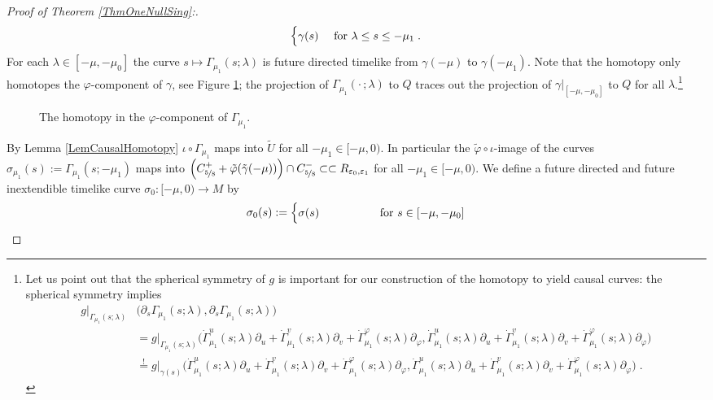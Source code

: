 \documentclass[reqno]{article}
\newcommand{\Reps}{R_{\varepsilon_0, \varepsilon_1}}
\begin{document}
\begin{proof}[Proof of Theorem \ref{ThmOneNullSing}:]
$$\begin{cases}
\gamma(s) &\textnormal{ for } \lambda \leq s \leq -\mu_1 \;. \end{cases}$$
For each $\lambda \in [-\mu, -\mu_0]$ the curve $s \mapsto \Gamma_{\mu_1} (s; \lambda)$ is future directed timelike from $\gamma(-\mu)$ to $\gamma(-\mu_1)$. Note that the homotopy only homotopes the $\varphi$-component of $\gamma$, see Figure \ref{FigPhiHomotop}; the projection of $\Gamma_{\mu_1}( \cdot \, ; \lambda)$ to $Q$ traces out the projection of $\gamma|_{[-\mu, -\mu_0]}$ to $Q$ for all $\lambda$.\footnote{Let us point out that the spherical symmetry of $g$ is important for our construction of the homotopy to yield causal curves: the spherical symmetry implies \begin{equation*} \begin{split} g|_{\Gamma_{\mu_1}(s;\lambda)} &\big(\partial_s \Gamma_{\mu_1} (s;\lambda), \partial_s \Gamma_{\mu_1}(s;\lambda)\big)  \\
&= g|_{\Gamma_{\mu_1}(s;\lambda)}  \big( \dot{\Gamma}_{\mu_1}^u (s;\lambda) \partial_u + \dot{\Gamma}_{\mu_1}^v(s;\lambda) \partial_v + \dot{\Gamma}_{\mu_1}^\varphi(s;\lambda) \partial_\varphi, \dot{\Gamma}_{\mu_1}^u (s;\lambda) \partial_u + \dot{\Gamma}_{\mu_1}^v(s;\lambda) \partial_v + \dot{\Gamma}_{\mu_1}^\varphi(s;\lambda) \partial_\varphi\big) \\
&\overset{!}{=}g|_{\gamma(s)}  \big( \dot{\Gamma}_{\mu_1}^u (s;\lambda) \partial_u + \dot{\Gamma}_{\mu_1}^v(s;\lambda) \partial_v + \dot{\Gamma}_{\mu_1}^\varphi(s;\lambda) \partial_\varphi, \dot{\Gamma}_{\mu_1}^u (s;\lambda) \partial_u + \dot{\Gamma}_{\mu_1}^v(s;\lambda) \partial_v + \dot{\Gamma}_{\mu_1}^\varphi(s;\lambda) \partial_\varphi\big) \;.
\end{split}
\end{equation*}
}
\begin{figure}[h]
\centering
 \def\svgwidth{8cm}
   
      \caption{The homotopy in the $\varphi$-component of $\Gamma_{\mu_1}$.} \label{FigPhiHomotop}
\end{figure}
By Lemma \ref{LemCausalHomotopy} $\iota \circ \Gamma_{\mu_1}$ maps into $\tilde{U}$ for all $-\mu_1 \in [-\mu, 0)$. In particular the $\tilde{\varphi} \circ \iota$-image of the curves $\sigma_{\mu_1}(s) := \Gamma_{\mu_1}(s; -\mu_1)$ maps into $\Big(C^+_{\nicefrac{5}{8}} + \tilde{\varphi}(\tilde{\gamma}(-\mu))\Big) \cap  C^-_{\nicefrac{5}{8}} \subset \subset \Reps$ for all $-\mu_1 \in [-\mu,0)$.  We define a future directed and future inextendible timelike curve $\sigma_0 : [-\mu,0) \to M$ by $$\sigma_0(s) := \begin{cases} \sigma(s) \qquad \qquad &\textnormal{ for } s \in [-\mu, -\mu_0] \\

\end{cases}$$
\end{proof}
\end{document}
